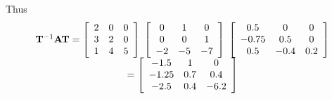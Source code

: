 Thus
\[
\begin{array}{c}
 {\bf{T}}^{ - 1} {\bf{AT}} = \left[ {\begin{array}{*{20}c}
   2 & 0 & 0  \\
   3 & 2 & 0  \\
   1 & 4 & 5  \\
\end{array}} \right]\;\left[ {\begin{array}{*{20}c}
   0 & 1 & 0  \\
   0 & 0 & 1  \\
   { - 2} & { - 5} & { - 7}  \\
\end{array}} \right]\;\left[ {\begin{array}{*{20}c}
   {0.5} & 0 & 0  \\
   { - 0.75} & {0.5} & 0  \\
   {0.5} & { - 0.4} & {0.2}  \\
\end{array}} \right] \\
  = \left[ {\begin{array}{*{20}c}
   { - 1.5} & 1 & 0  \\
   { - 1.25} & {0.7} & {0.4}  \\
   { - 2.5} & {0.4} & { - 6.2}  \\
\end{array}} \right] \\
 \end{array}
\]

